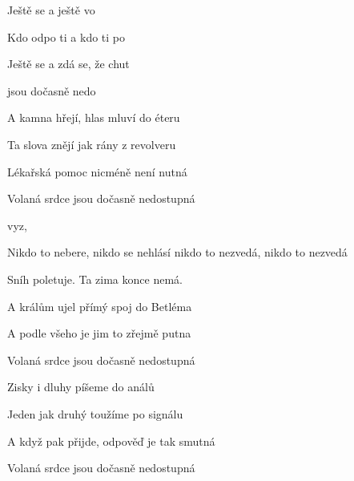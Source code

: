 


\zs
Ještě se  a ještě  vo

Kdo odpo ti a kdo ti  po

Ještě se  a zdá se, že  chut

  jsou dočasně nedo
\ks

\zs
A kamna hřejí, hlas mluví do éteru

Ta slova znějí jak rány z revolveru

Lékařská pomoc nicméně není nutná

Volaná srdce jsou dočasně nedostupná
\ks

\zr
{}   vyz,       

Nikdo to nebere,
nikdo se nehlásí
nikdo to nezvedá,
nikdo to nezvedá
\kr

\zs
Sníh poletuje. Ta zima konce nemá.

A králům ujel přímý spoj do Betléma

A podle všeho je jim to zřejmě putna

Volaná srdce jsou dočasně nedostupná
\ks

\zr \kr

\zs
Zisky i dluhy píšeme do análů

Jeden jak druhý toužíme po signálu

A když pak přijde, odpověď je tak smutná

Volaná srdce jsou dočasně nedostupná
\ks

\zr \kr


\kp







